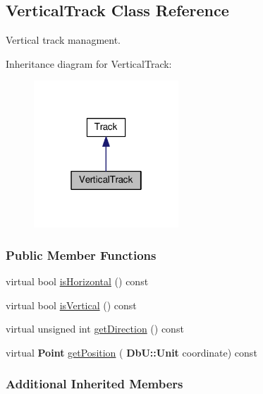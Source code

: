 \hypertarget{classKite_1_1VerticalTrack}{}\subsection{Vertical\+Track Class Reference}
\label{classKite_1_1VerticalTrack}


Vertical track managment.  




Inheritance diagram for Vertical\+Track\+:\nopagebreak
\begin{figure}[H]
\begin{center}
\leavevmode
\includegraphics[width=154pt]{classKite_1_1VerticalTrack__inherit__graph}
\end{center}
\end{figure}
\subsubsection*{Public Member Functions}
\begin{DoxyCompactItemize}
\item 
virtual bool \hyperlink{classKite_1_1VerticalTrack_a21b9cefd33ae22e4c2070ad441bdd30b}{is\+Horizontal} () const
\item 
virtual bool \hyperlink{classKite_1_1VerticalTrack_abd54544ef1710ee4b67cfb021d73446c}{is\+Vertical} () const
\item 
virtual unsigned int \hyperlink{classKite_1_1VerticalTrack_a0dd7cf705ace42c662c289955313b2e9}{get\+Direction} () const
\item 
virtual \textbf{ Point} \hyperlink{classKite_1_1VerticalTrack_a6ab4f8026e4500918aa8721f1199f8b6}{get\+Position} (\textbf{ Db\+U\+::\+Unit} coordinate) const
\end{DoxyCompactItemize}
\subsubsection*{Additional Inherited Members}



